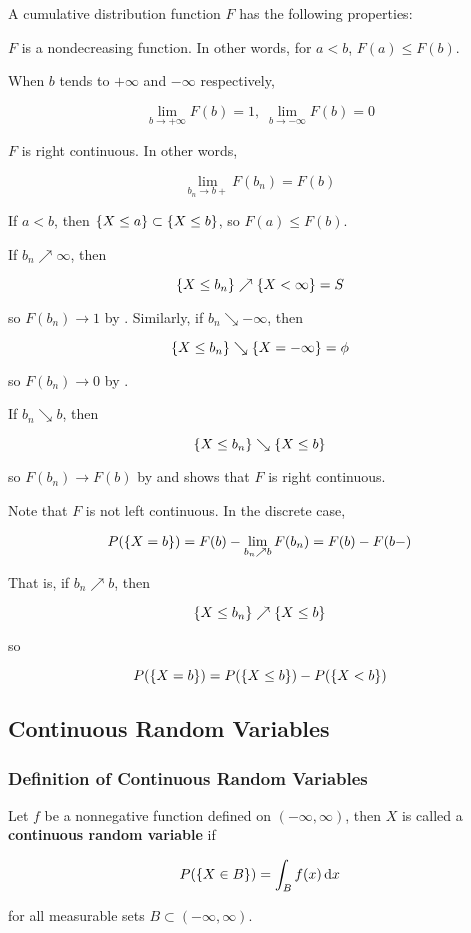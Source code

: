 \documentclass[a4paper,12pt]{article}
\begin{document}
\begin{pst}
  A cumulative distribution function $F$ has the following properties:

  \begin{alist}
    \item $F$ is a nondecreasing function. In other words, for $a<b$, $F(a)\leq F(b)$.
    \item When $b$ tends to $+\infty$ and $-\infty$ respectively,
    
    $$\lim_{b\to+\infty}F(b)=1,\;\lim_{b\to-\infty}F(b)=0$$

    \item $F$ is right continuous. In other words,
    
    $$\lim_{b_{n}\to b+}F(b_{n})=F(b)$$
  \end{alist}

  \prf{} If $a<b$, then $\left\{ X\leq a\right\}\subset\left\{ X\leq b\right\}$, so $F(a)\leq F(b)$.\n

   If $b_{n}\nearrow\infty$, then
  
  $$\left\{ X\leq b_{n}\right\}\nearrow\left\{ X<\infty\right\}=S$$\s
  
  so $F(b_{n})\to 1$ by \rpst[\sctr{2}]. Similarly, if $b_{n}\searrow-\infty$, then
  
  $$\left\{ X\leq b_{n}\right\}\searrow\left\{ X=-\infty\right\}=\phi$$\s
  
  so $F(b_{n})\to 0$ by \rpst[\sctr{2}].\n

   If $b_{n}\searrow b$, then

  $$\left\{ X\leq b_{n}\right\}\searrow\left\{ X\leq b\right\}$$\s

  so $F(b_{n})\to F(b)$ by \rpst[\sctr{2}] and shows that $F$ is right continuous.
\end{pst}\n

Note that $F$ is not left continuous. In the discrete case,

$$P(\left\{ X=b\right\})=F(b)-\lim_{b_{n}\nearrow b}F(b_{n})=F(b)-F(b-)$$\s

That is, if $b_{n}\nearrow b$, then

$$\left\{ X\leq b_{n}\right\}\nearrow\left\{ X\leq b\right\}$$\s

so

$$P(\left\{ X=b\right\})=P(\left\{ X\leq b\right\})-P(\left\{ X<b\right\})$$

\subsection{Continuous Random Variables}
\subsubsection{Definition of Continuous Random Variables}
\begin{dft}
  Let $f$ be a nonnegative function defined on $(-\infty,\infty)$, then $X$ is called a \textbf{continuous random variable} if

  $$P(\left\{ X\in B\right\})=\int_{B}f(x)\,\mathrm{d} x$$\s

  for all measurable sets $B\subset(-\infty,\infty)$.
\end{dft}\n
\end{document}
